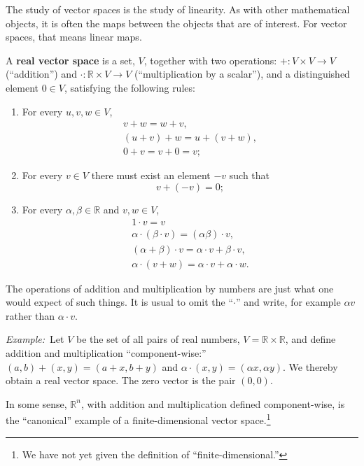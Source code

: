\documentclass[10pt, a4paper, twocolumn]{article}
\newcommand{\R}{\mathbb{R}}
\newcommand{\defn}[1]{\textbf{#1}}
\newcommand{\eg}{\emph{Example:}\relax}
\begin{document}
The study of vector spaces is the study of linearity. As with other mathematical
objects, it is often the maps between the objects that are of interest. For
vector spaces, that means linear maps.

A \defn{real vector space} is a set, $V$, together with two operations: ${+}:V \times V \to V$ (“addition”)
and ${\cdot}:\R \times V \to V$ (“multiplication by a scalar”), and a distinguished element $ 0\in V$, satisfying
the following rules:
\begin{enumerate}
\item
  For every $u, v, w \in V$,
  \begin{equation*}
    \begin{gathered}
      v + w = w + v, \\
      (u + v) + w = u + (v + w), \\
      0 + v = v + 0 = v;
      \end{gathered}
  \end{equation*}
\item For every $v \in V$ there must exist an element $-v$ such that
  \begin{equation*}
    v + (-v) = 0; 
  \end{equation*}
\item For every $\alpha, \beta \in \R$ and $v, w \in V$,
  \begin{equation*}
    \begin{gathered}
      1 \cdot v = v \\
      \alpha \cdot (\beta \cdot v) = (\alpha \beta) \cdot v, \\
      (\alpha + \beta) \cdot v = \alpha \cdot v + \beta \cdot v, \\
      \alpha \cdot (v + w) = \alpha \cdot v + \alpha \cdot w.
    \end{gathered}
  \end{equation*}
\end{enumerate}
The operations of addition and multiplication by numbers are just what one would expect of such
things. It is usual to omit the “$\cdot$” and write, for example $\alpha v$ rather than $\alpha \cdot v$.

\eg\ Let $V$ be the set of all pairs of real numbers, $V = \R \times \R$, and define addition and
multiplication “component-wise:” $(a, b) + (x, y) = (a + x, b + y)$ and $\alpha \cdot (x, y) = (\alpha x, \alpha y)$. We
thereby obtain a real vector space. The zero vector is the pair $(0, 0)$.

In some sense, $\R^n$, with addition and multiplication defined component-wise, is the “canonical”
example of a finite-dimensional vector space.\footnote{We have not yet given the definition of
  “finite-dimensional.”}
\end{document}
